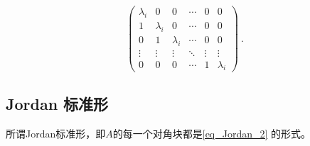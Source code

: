 \begin{equation}\label{eq_Jordan_2}
\left(\begin{array}{cccccc}
\lambda_i & 0 & 0 & \cdots & 0 & 0 \\
1 & \lambda_i & 0 & \cdots & 0 & 0 \\
0 & 1 & \lambda_i & \cdots & 0 & 0 \\
\vdots & \vdots & \vdots & \ddots & \vdots & \vdots \\
0 & 0 & 0 & \cdots & 1 & \lambda_i
\end{array}\right)~.
\end{equation}
\subsection{Jordan 标准形}
所谓Jordan标准形，即$A$的每一个对角块都是\autoref{eq_Jordan_2} 的形式。
